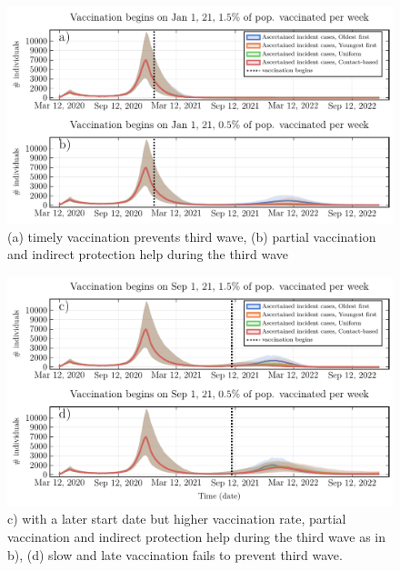 \documentclass{beamer}
\begin{document}
\begin{frame}{}
    \begin{figure}
    \includegraphics[width = \textwidth]{covid/main_text_ts_1.pdf}
    \caption{(a) timely vaccination prevents third wave, (b) partial vaccination and indirect protection help during the third wave}
    \end{figure}
\end{frame}
\begin{frame}{}
    \begin{figure}
    \includegraphics[width = \textwidth]{covid/main_text_ts_2.pdf}
    \caption{c) with a later start date but higher vaccination rate, partial vaccination and indirect protection help during the third wave as in b), (d) slow and late vaccination fails to prevent third wave.}
    \end{figure}
\end{frame}
\end{document}
